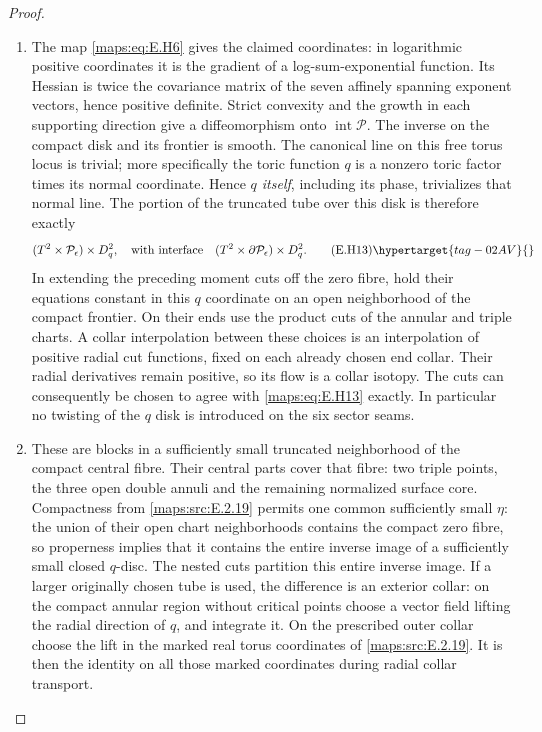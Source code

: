 \begin{proof}
\begin{enumerate}[label={$\langle1\rangle$\arabic*.},leftmargin=*]
\item The map \eqref{maps:eq:E.H6} gives the claimed coordinates: in logarithmic
positive coordinates it is the gradient of a log-sum-exponential
function.  Its Hessian is twice the covariance matrix of the
seven affinely spanning exponent vectors, hence positive
definite.  Strict convexity and the growth in each supporting
direction give a diffeomorphism onto
$\operatorname{int}\mathcal P$.  The inverse on the compact
disk and its frontier is smooth.  The canonical line on this
free torus locus is trivial; more specifically the toric
function $q$ is a nonzero toric factor times its normal
coordinate.  Hence \emph{$q$ itself}, including its phase,
trivializes that normal line.  The portion of the truncated
tube over this disk is therefore exactly
\[
 (T^2\times\mathcal P_\epsilon)\times D^2_q,
 \quad\hbox{with interface}\quad
 (T^2\times\partial\mathcal P_\epsilon)\times D^2_q.
 \tag{E.H13}\hypertarget{tag-02AV}{}\label{maps:eq:E.H13}
\]
In extending the preceding moment cuts off the zero fibre,
hold their equations constant in this $q$ coordinate on an
open neighborhood of the compact frontier.  On their ends
use the product cuts of the annular and triple charts.  A
collar interpolation between these choices is an interpolation
of positive radial cut functions, fixed on each already chosen
end collar.  Their radial derivatives remain positive, so its
flow is a collar isotopy.  The cuts can consequently be chosen
to agree with \eqref{maps:eq:E.H13} exactly.  In particular no twisting of
the $q$ disk is introduced on the six sector seams.

\item These are blocks in a sufficiently small truncated
neighborhood of the compact central fibre.  Their central
parts cover that fibre: two triple points, the three open
double annuli and the remaining normalized surface core.
Compactness from \ref{maps:src:E.2.19} permits one common sufficiently small
$\eta$: the union of their open chart neighborhoods contains
the compact zero fibre, so properness implies that it contains
the entire inverse image of a sufficiently small closed
$q$-disc.  The nested cuts partition this entire inverse image.
If a larger originally chosen tube is used, the
difference is an exterior collar: on the compact annular
region without critical points choose a vector field lifting
the radial direction of $q$, and integrate it.  On the
prescribed outer collar choose the lift in the marked real
torus coordinates of \ref{maps:src:E.2.19}.  It is then the identity on all
those marked coordinates during radial collar transport.



\end{enumerate}
\end{proof}
